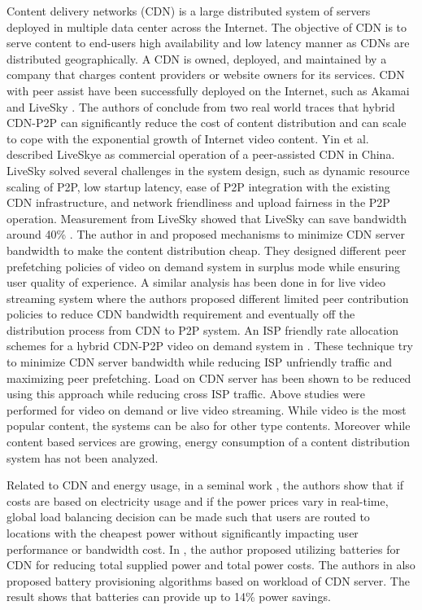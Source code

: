 Content delivery networks (CDN) is a large distributed system of servers deployed in multiple data center across the Internet. 
The objective of CDN is to serve content to end-users high availability and low latency manner as CDNs are distributed geographically. 
A CDN is owned, deployed, and maintained by a company that charges content providers or website owners for its services.
CDN with peer assist have been successfully deployed on the Internet, such as Akamai \cite{Huang:2008:UHC:1496046.1496064} and LiveSky \cite{Yin:2010:LEC:1823746.1823750}.  
The authors of \cite{Huang:2008:UHC:1496046.1496064} conclude from two real world traces that hybrid CDN-P2P can significantly reduce the cost of content distribution and can scale to cope with the exponential growth of Internet video content.  
Yin et al. \cite{Yin:2010:LEC:1823746.1823750} described LiveSkye as commercial operation of a peer-assisted CDN in China.  
LiveSky solved several challenges in the system design, such as dynamic resource scaling of P2P, low startup latency, ease of P2P integration with the existing CDN infrastructure, and network friendliness and upload fairness in the P2P operation.  
Measurement from LiveSky showed that LiveSky can save bandwidth around 40\% \cite{Yin:2010:LEC:1823746.1823750}.
The author in \cite{Huang:2007:IVP:1282427.1282396} and \cite{huang2007peer} proposed mechanisms to minimize CDN server bandwidth to make the content distribution cheap.
They designed different peer prefetching policies of video on demand system in surplus mode while ensuring user quality of experience.
A similar analysis has been done in \cite{xu2006analysis} for live video streaming system where the authors proposed different limited peer contribution policies to reduce CDN bandwidth requirement and eventually off the distribution process from CDN to P2P system. 
An ISP friendly rate allocation schemes for a hybrid CDN-P2P video on demand system in \cite{Wang:2008:IRA:1459359.1459397}. 
These technique try to minimize CDN server bandwidth while reducing ISP unfriendly traffic and maximizing peer prefetching.
Load on CDN server has been shown to be reduced using this approach while reducing cross ISP traffic.
Above studies were performed for video on demand or live video streaming.
While video is the most popular content, the systems can be also for other type contents.
Moreover while content based services are growing, energy consumption of a content distribution system has not been analyzed.

Related to CDN and energy usage, in a seminal work \cite{qureshi2009cutting}, the authors show that if costs are based on electricity usage and if the power prices vary in real-time, global load balancing decision can be made such that users are routed to locations with the cheapest power without significantly impacting user performance or bandwidth cost.  
In \cite{Palasamudram:2012:UBR:2391229.2391240}, the author proposed utilizing batteries for CDN for reducing total supplied power and total power costs.
The authors in \cite{Palasamudram:2012:UBR:2391229.2391240} also proposed battery provisioning algorithms based on workload of CDN server. 
The result shows that batteries can provide up to 14\% power savings.

